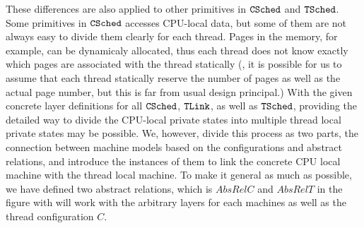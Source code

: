 These differences are also applied to 
other primitives in ${{\mathrm{\texttt{CSched}}}}$ and ${{\mathrm{\texttt{TSched}}}}$.
Some primitives in ${{\mathrm{\texttt{CSched}}}}$ accesses CPU-local data, but some of them 
are not always easy to divide them clearly for each thread. 
Pages in the memory, for example, 
can be dynamicaly allocated, thus 
each thread does not know exactly 
which pages are associated with the thread statically
(\ie, it is possible for us to assume that each thread statically 
reserve the number of pages as well as 
the actual page number, but this is far from usual design principal.)
With the given concrete layer definitions for 
all ${{\mathrm{\texttt{CSched}}}}$, ${{\mathrm{\texttt{TLink}}}}$, as well as ${{\mathrm{\texttt{TSched}}}}$,
providing the detailed 
way to divide the CPU-local private states into multiple thread local private states 
may be possible. 
We, however, divide this process 
as two parts, the connection between machine models based on the configurations and abstract relations, 
and introduce the instances of them to link the concrete CPU local machine with 
the thread local machine. 
To make it general as much as possible, 
we have defined two abstract relations, 
which is $AbsRelC$ and $AbsRelT$ in the figure with will work 
with the arbitrary layers for each machines as well as the thread configuration $C$. 

